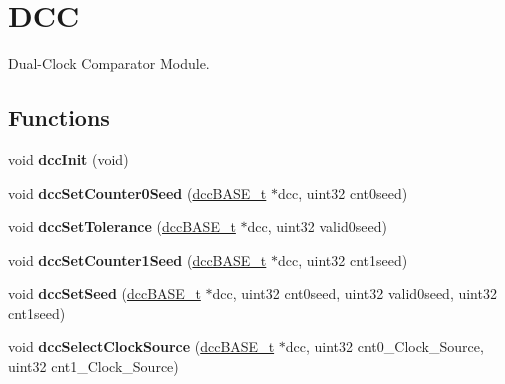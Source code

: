 \hypertarget{group__DCC}{}\section{D\+CC}
\label{group__DCC}


Dual-\/\+Clock Comparator Module.  


\subsection*{Functions}
\begin{DoxyCompactItemize}
\item 
\mbox{\label{group__DCC_ga0dd3978e160dfef206dac238dac4e162}} 
void {\bfseries dcc\+Init} (void)
\item 
\mbox{\label{group__DCC_ga9855ebf4f9c4234e64715d0afe456e16}} 
void {\bfseries dcc\+Set\+Counter0\+Seed} (\mbox{\hyperlink{reg__dcc_8h_a205f6a2ff77f73c35e0033f9d7a4567b}{dcc\+B\+A\+S\+E\+\_\+t}} $\ast$dcc, uint32 cnt0seed)
\item 
\mbox{\label{group__DCC_ga151f684ea49086a86236fec15719df40}} 
void {\bfseries dcc\+Set\+Tolerance} (\mbox{\hyperlink{reg__dcc_8h_a205f6a2ff77f73c35e0033f9d7a4567b}{dcc\+B\+A\+S\+E\+\_\+t}} $\ast$dcc, uint32 valid0seed)
\item 
\mbox{\label{group__DCC_ga099a6928c50260aded30765dd4c480bb}} 
void {\bfseries dcc\+Set\+Counter1\+Seed} (\mbox{\hyperlink{reg__dcc_8h_a205f6a2ff77f73c35e0033f9d7a4567b}{dcc\+B\+A\+S\+E\+\_\+t}} $\ast$dcc, uint32 cnt1seed)
\item 
\mbox{\label{group__DCC_gaddc2f75f33d74b8457e3dbf386f7e862}} 
void {\bfseries dcc\+Set\+Seed} (\mbox{\hyperlink{reg__dcc_8h_a205f6a2ff77f73c35e0033f9d7a4567b}{dcc\+B\+A\+S\+E\+\_\+t}} $\ast$dcc, uint32 cnt0seed, uint32 valid0seed, uint32 cnt1seed)
\item 
\mbox{\label{group__DCC_ga8d91c6456112601d8d2b5a3b7b87e3c3}} 
void {\bfseries dcc\+Select\+Clock\+Source} (\mbox{\hyperlink{reg__dcc_8h_a205f6a2ff77f73c35e0033f9d7a4567b}{dcc\+B\+A\+S\+E\+\_\+t}} $\ast$dcc, uint32 cnt0\+\_\+\+Clock\+\_\+\+Source, uint32 cnt1\+\_\+\+Clock\+\_\+\+Source)
\item 
\mbox{\label{group__DCC_ga148a3f93b524223a3f9db6c5d4f27cb4}} 

\end{DoxyCompactItemize}
